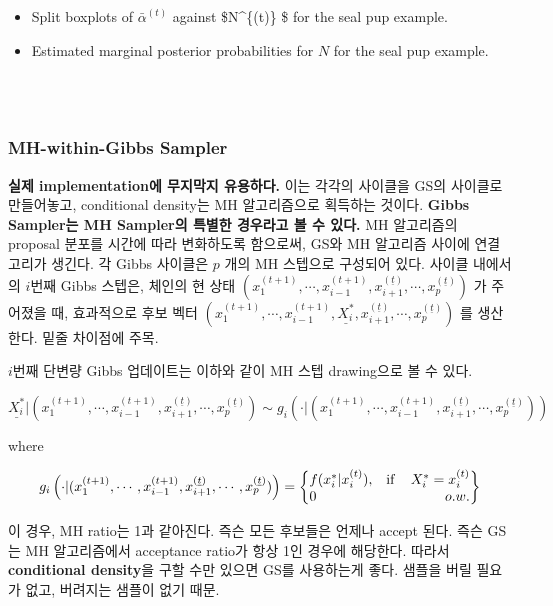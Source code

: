 \documentclass[
]{book}
\providecommand{\tightlist}{%
  \setlength{\itemsep}{0pt}\setlength{\parskip}{0pt}}
\begin{document}
\begin{itemize}
\tightlist
\item
  Split boxplots of \(\bar {\alpha}^{(t)}\) against \$N\^{}\{(t)\} \$ for the seal pup example.
\item
  Estimated marginal posterior probabilities for \(N\) for the seal pup example.
\end{itemize}

~\\
~\\

\hypertarget{mh-within-gibbs-sampler}{%
\subsubsection{MH-within-Gibbs Sampler}\label{mh-within-gibbs-sampler}}

\textbf{실제 implementation에 무지막지 유용하다.} 이는 각각의 사이클을 GS의 사이클로 만들어놓고, conditional density는 MH 알고리즘으로 획득하는 것이다. \textbf{Gibbs Sampler는 MH Sampler의 특별한 경우라고 볼 수 있다.} MH 알고리즘의 proposal 분포를 시간에 따라 변화하도록 함으로써, GS와 MH 알고리즘 사이에 연결고리가 생긴다. 각 Gibbs 사이클은 \(p\) 개의 MH 스텝으로 구성되어 있다. 사이클 내에서의 \(i\)번째 Gibbs 스텝은, 체인의 현 상태 \((x_{1}^{(t+1)}, \cdots, x_{i-1}^{(t+1)}, x_{i+1}^{(\underline{t})}, \cdots, x_{p}^{(\underline{t})})\) 가 주어졌을 때, 효과적으로 후보 벡터 \((x_{1}^{(t+1)}, \cdots, x_{i-1}^{(t+1)}, {\underline{X_i^{*}}}, x_{i+1}^{(\underline{t})}, \cdots, x_{p}^{(\underline{t})})\) 를 생산한다. 밑줄 차이점에 주목.

\(i\)번째 단변량 Gibbs 업데이트는 이하와 같이 MH 스텝 drawing으로 볼 수 있다.

\[
{\underline{X_i^{*}}} \rvert  (x_{1}^{(t+1)}, \cdots, x_{i-1}^{(t+1)}, x_{i+1}^{(\underline{t})}, \cdots, x_{p}^{(\underline{t})}) \sim g_i \left( \cdot \rvert (x_{1}^{(t+1)}, \cdots, x_{i-1}^{(t+1)},  x_{i+1}^{(\underline{t})}, \cdots, x_{p}^{(\underline{t})}) \right)
\]

where

\[
g_i \left( \cdot \rvert (x_{1}^{(t+1)}, \cdots, x_{i-1}^{(t+1)},  x_{i+1}^{(\underline{t})}, \cdots, x_{p}^{(\underline{t})})\right) 
= \left\{
\begin{array}{@{}lr@{}}
f(x_i^{*} \rvert x_i^{(t)} ), & \text{if } \; \; \; X_i^{*} = x_i^{(t)} \\
0 &  o.w.
\end{array}\right\}
\]

이 경우, MH ratio는 1과 같아진다. 즉슨 모든 후보들은 언제나 accept 된다. 즉슨 GS는 MH 알고리즘에서 acceptance ratio가 항상 1인 경우에 해당한다. 따라서 \textbf{conditional density}을 구할 수만 있으면 GS를 사용하는게 좋다. 샘플을 버릴 필요가 없고, 버려지는 샘플이 없기 때문.
\end{document}
